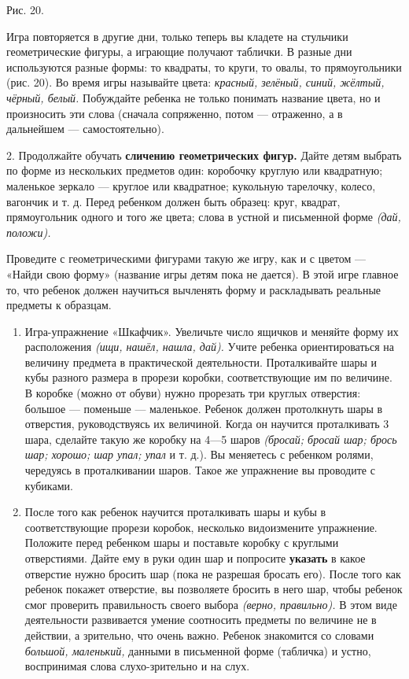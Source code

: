 \documentclass[a5paper]{book}
\renewcommand{\emph}[1]{\textit{#1}}
\begin{document}
Рис. 20.

Игра повторяется в другие дни, только теперь вы кладете на стульчики
геометрические фигуры, а играющие получают таблички. В разные дни
используются разные формы: то квадраты, то круги, то овалы, то
прямоугольники (рис. 20). Во время игры называйте цвета: \emph{красный,
зелёный, синий, жёлтый, чёрный, белый.} Побуждайте ребенка не только
понимать название цвета, но и произносить эти слова (сначала сопряженно,
потом --- отраженно, а в дальнейшем --- самостоятельно).

2. Продолжайте обучать \textbf{сличению геометрических фигур.} Дайте
детям выбрать по форме из нескольких предметов один: коробочку круглую
или квадратную; маленькое зеркало --- круглое или квадратное; кукольную
тарелочку, колесо, вагончик и т. д. Перед ребенком должен быть образец:
круг, квадрат, прямоугольник одного и того же цвета; слова в устной и
письменной форме \emph{(дай, положи).}

Проведите с геометрическими фигурами такую же игру, как и с цветом ---
«Найди свою форму» (название игры детям пока не дается). В этой игре
главное то, что ребенок должен научиться вычленять форму и раскладывать
реальные предметы к образцам.


\begin{enumerate}
\def\labelenumi{\arabic{enumi}.}
\setcounter{enumi}{2}
\item
  
  Игра-упражнение «Шкафчик». Увеличьте число ящичков и меняйте форму их
  расположения \emph{(ищи, нашёл, нашла, дай).} Учите ребенка
  ориентироваться на величину предмета в практической деятельности.
  Проталкивайте шары и кубы разного размера в прорези коробки,
  соответствующие им по величине. В коробке (можно от обуви) нужно
  прорезать три круглых отверстия: большое --- поменьше --- маленькое.
  Ребенок должен протолкнуть шары в отверстия, руководствуясь их
  величиной. Когда он научится проталкивать 3 шара, сделайте такую же
  коробку на 4---5 шаров \emph{(бросай; бросай шар; брось шар; хорошо;
  шар упал; упал} и т. д.). Вы меняетесь с ребенком ролями, чередуясь в
  проталкивании шаров. Такое же упражнение вы проводите с кубиками.
  
\item
  
  После того как ребенок научится проталкивать шары и кубы в
  соответствующие прорези коробок, несколько видоизмените упражнение.
  Положите перед ребенком шары и поставьте коробку с круглыми
  отверстиями. Дайте ему в руки один шар и попросите \textbf{указать} в
  какое отверстие нужно бросить шар (пока не разрешая бросать его).
  После того как ребенок покажет отверстие, вы позволяете бросить в него
  шар, чтобы ребенок смог проверить правильность своего выбора
  \emph{(верно, правильно).} В этом виде деятельности развивается умение
  соотносить предметы по величине не в действии, а зрительно, что очень
  важно. Ребенок знакомится со словами \emph{большой, маленький,}
  данными в письменной форме (табличка) и устно, воспринимая слова
  слухо-зрительно и на слух.
  
\end{enumerate}
\end{document}
